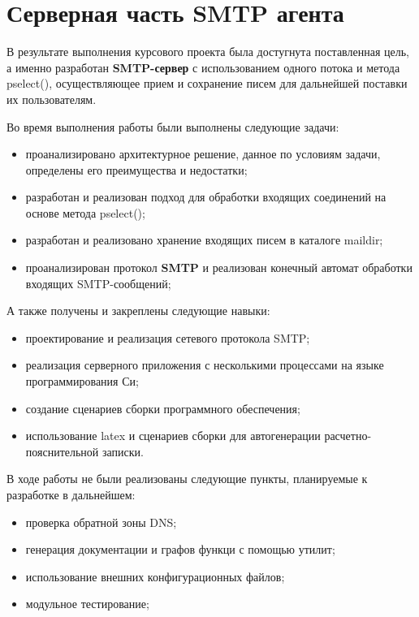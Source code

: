 \documentclass[a4paper,12pt]{report}
\begin{document}
\section{Серверная часть SMTP агента}

В результате выполнения курсового проекта была достугнута поставленная цель, а именно разработан
\textbf{SMTP-сервер} с использованием одного потока и метода pselect(), осуществляющее прием и сохранение писем
для дальнейшей поставки их пользователям.

Во время выполнения работы были выполнены следующие задачи:
\begin{itemize}
    \item проанализировано архитектурное решение, данное по условиям задачи, определены его преимущества и недостатки;
    \item разработан и реализован подход для обработки входящих соединений на основе метода pselect();
    \item разработан и реализовано хранение входящих писем в каталоге maildir;
    \item проанализирован протокол \textbf{SMTP} и реализован конечный автомат обработки входящих SMTP-сообщений;
\end{itemize}

А также получены и закреплены следующие навыки:
\begin{itemize}
    \item проектирование и реализация сетевого протокола SMTP;
    \item реализация серверного приложения с несколькими процессами на языке программирования Си;
    \item создание сценариев сборки программного обеспечения;
    \item использование latex и сценариев сборки для автогенерации расчетно-пояснительной записки.
\end{itemize}

В ходе работы не были реализованы следующие пункты, планируемые к разработке в дальнейшем:
\begin{itemize}
    \item проверка обратной зоны DNS;
    \item генерация документации и графов функци с помощью утилит;
    \item использование внешних конфигурационных файлов;
    \item модульное тестирование;
\end{itemize}
\end{document}
